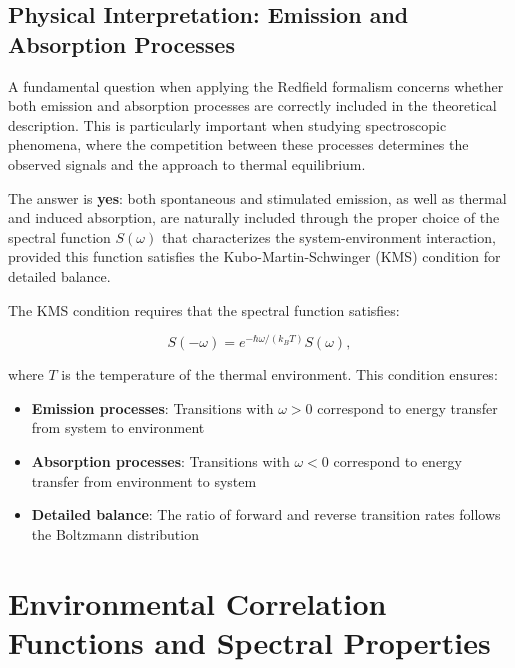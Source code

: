 \subsection{Physical Interpretation: Emission and Absorption Processes}

A fundamental question when applying the Redfield formalism concerns whether both emission and absorption processes are correctly included in the theoretical description. This is particularly important when studying spectroscopic phenomena, where the competition between these processes determines the observed signals and the approach to thermal equilibrium.

The answer is \textbf{yes}: both spontaneous and stimulated emission, as well as thermal and induced absorption, are naturally included through the proper choice of the spectral function $S(\omega)$ that characterizes the system-environment interaction, provided this function satisfies the Kubo-Martin-Schwinger (KMS) condition for detailed balance.

The KMS condition requires that the spectral function satisfies:

\begin{equation}
    S(-\omega) = e^{-\hbar\omega/(k_B T)} S(\omega),
    \label{eq:kms_condition}
\end{equation}

where $T$ is the temperature of the thermal environment. This condition ensures:

\begin{itemize}
    \item \textbf{Emission processes}: Transitions with $\omega > 0$ correspond to energy transfer from system to environment
    \item \textbf{Absorption processes}: Transitions with $\omega < 0$ correspond to energy transfer from environment to system
    \item \textbf{Detailed balance}: The ratio of forward and reverse transition rates follows the Boltzmann distribution
\end{itemize}


\section{Environmental Correlation Functions and Spectral Properties}
\label{sec:environmental_correlation_functions}

